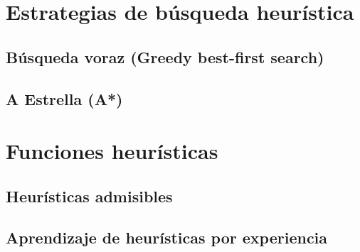 \documentclass[12pt,a4paper]{report}
\begin{document}
\section{Estrategias de búsqueda heurística}
\subsection*{Búsqueda voraz (Greedy best-first search)}
\subsection*{A Estrella (A*)}

\section{Funciones heurísticas}
\subsection*{Heurísticas admisibles}
\subsection*{Aprendizaje de heurísticas por experiencia}
\end{document}
